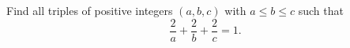 Find all triples of positive integers $(a,b,c)$ with $a\le b\le c$ such that
\[
\dfrac{2}{a}+\dfrac{2}{b}+\dfrac{2}{c}=1 .
\]
